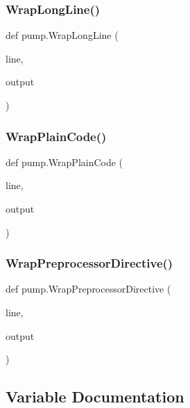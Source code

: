 \mbox{\label{namespacepump_a02427e2ddc80f0f408e27dfc3e38e702}} 
\subsubsection{\texorpdfstring{WrapLongLine()}{WrapLongLine()}}
{\footnotesize\ttfamily def pump.\+Wrap\+Long\+Line (\begin{DoxyParamCaption}\item[{}]{line,  }\item[{}]{output }\end{DoxyParamCaption})}

\mbox{\label{namespacepump_a60723738cc38d8ced7e2cfecc72d8b11}} 
\subsubsection{\texorpdfstring{WrapPlainCode()}{WrapPlainCode()}}
{\footnotesize\ttfamily def pump.\+Wrap\+Plain\+Code (\begin{DoxyParamCaption}\item[{}]{line,  }\item[{}]{output }\end{DoxyParamCaption})}

\mbox{\label{namespacepump_a59e8ae06bae068d2d72df4f0340635d8}} 
\subsubsection{\texorpdfstring{WrapPreprocessorDirective()}{WrapPreprocessorDirective()}}
{\footnotesize\ttfamily def pump.\+Wrap\+Preprocessor\+Directive (\begin{DoxyParamCaption}\item[{}]{line,  }\item[{}]{output }\end{DoxyParamCaption})}



\subsection{Variable Documentation}
\mbox{\label{namespacepump_a45644ad738e584ec754f6d9f45fe693c}} 

